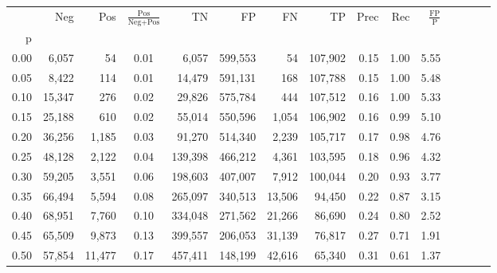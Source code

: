 \begin{tabular}{rrrcrrrrrrrrrrr}
\toprule
{} &     Neg &     Pos & $\frac{\text{Pos}}{\text{Neg}+\text{Pos}}$ &       TN &       FP &       FN &       TP &  Prec &   Rec & $\frac{\text{FP}}{\text{P}}$ \\
p    &         &         &                                            &          &          &          &          &       &       &                              \\
\midrule
0.00 &   6,057 &      54 &                                       0.01 &    6,057 &  599,553 &       54 &  107,902 &  0.15 &  1.00 &                         5.55 \\
0.05 &   8,422 &     114 &                                       0.01 &   14,479 &  591,131 &      168 &  107,788 &  0.15 &  1.00 &                         5.48 \\
0.10 &  15,347 &     276 &                                       0.02 &   29,826 &  575,784 &      444 &  107,512 &  0.16 &  1.00 &                         5.33 \\
0.15 &  25,188 &     610 &                                       0.02 &   55,014 &  550,596 &    1,054 &  106,902 &  0.16 &  0.99 &                         5.10 \\
0.20 &  36,256 &   1,185 &                                       0.03 &   91,270 &  514,340 &    2,239 &  105,717 &  0.17 &  0.98 &                         4.76 \\
0.25 &  48,128 &   2,122 &                                       0.04 &  139,398 &  466,212 &    4,361 &  103,595 &  0.18 &  0.96 &                         4.32 \\
0.30 &  59,205 &   3,551 &                                       0.06 &  198,603 &  407,007 &    7,912 &  100,044 &  0.20 &  0.93 &                         3.77 \\
0.35 &  66,494 &   5,594 &                                       0.08 &  265,097 &  340,513 &   13,506 &   94,450 &  0.22 &  0.87 &                         3.15 \\
0.40 &  68,951 &   7,760 &                                       0.10 &  334,048 &  271,562 &   21,266 &   86,690 &  0.24 &  0.80 &                         2.52 \\
0.45 &  65,509 &   9,873 &                                       0.13 &  399,557 &  206,053 &   31,139 &   76,817 &  0.27 &  0.71 &                         1.91 \\
0.50 &  57,854 &  11,477 &                                       0.17 &  457,411 &  148,199 &   42,616 &   65,340 &  0.31 &  0.61 &                         1.37 \\

\end{tabular}
